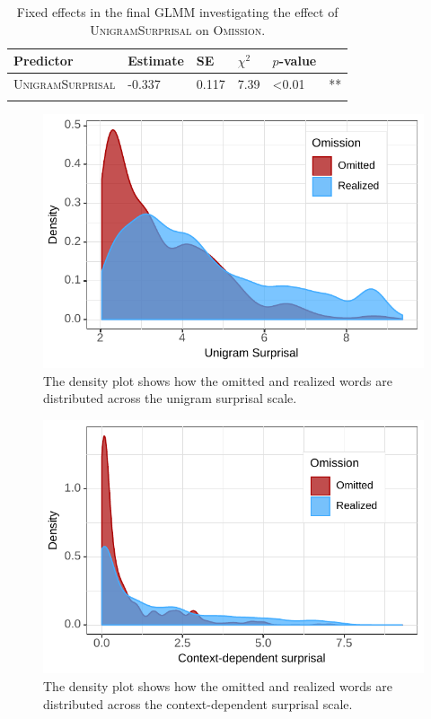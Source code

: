 \begin{table}[t]
\begin{tabular}{l l l l l l}
\lsptoprule
Predictor & Estimate & SE & $\chi^2$ &  $p$-value &  \\   
\midrule
\textsc{UnigramSurprisal} & -0.337 & 0.117 & 7.39 & \textless 0.01 & **\\
\lspbottomrule
\end{tabular}
\caption{Fixed effects in the final GLMM investigating the effect of \textsc{UnigramSurprisal} on \textsc{Omission}.\label{tab:production-unigram-estimates}}
\end{table}

\begin{figure}[t]
  \includegraphics{figures/scr_production_density_unigram}
   \caption{The density plot shows how the omitted and realized words are distributed across the unigram surprisal scale.\label{fig:production_density-unigram}}
\end{figure}

\begin{figure}[t]
  \includegraphics{figures/scr_production_density_context}
     \caption{The density plot shows how the omitted and realized words are distributed across the context-dependent surprisal scale.\label{fig:production_density-context}}
\end{figure}

